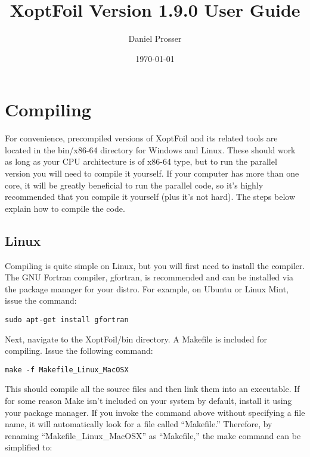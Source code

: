 \documentclass[11pt]{article}
\begin{document}
\title{XoptFoil Version 1.9.0 User Guide}
\author{Daniel Prosser}
\date{\today}
\maketitle

\tableofcontents

\section{Compiling}

For convenience, precompiled versions of XoptFoil and its related tools are
located in the bin/x86-64 directory for Windows and Linux. These should work as long as
your CPU architecture is of x86-64 type, but to run the parallel version you will need to
compile it yourself. If your computer has more than one core, it will be greatly
beneficial to run the parallel code, so it's highly recommended that you compile it
yourself (plus it's not hard). The steps below explain how to compile the code.

\subsection{Linux}

Compiling is quite simple on Linux, but you will first need to install the compiler. The
GNU Fortran compiler, gfortran, is recommended and can be installed via the package
manager for your distro.  For example, on Ubuntu or Linux Mint, issue the command:

\begin{verbatim}
sudo apt-get install gfortran
\end{verbatim}

Next, navigate to the XoptFoil/bin directory.  A Makefile is included for compiling. Issue
the following command:

\begin{verbatim}
make -f Makefile_Linux_MacOSX
\end{verbatim}

This should compile all the source files and then link them into an executable.  If for
some reason Make isn't included on your system by default, install it using your package 
manager. If you invoke the command above without specifying a file name, it will 
automatically look
for a file called ``Makefile.''  Therefore, by renaming ``Makefile\_Linux\_MacOSX'' as
``Makefile,'' the make command can be simplified to:
\end{document}
